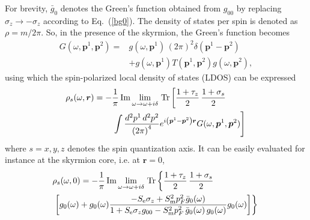 \documentclass[twocolumn,showpacs,floatfix,longbibliography]{revtex4-1}
\begin{document}
For brevity, $\bar g_{0}$ denotes the Green's function obtained from $g_{00}$ by replacing $\sigma_z \rightarrow - \sigma_z$ according to Eq.~(\ref{bg0}). The density of states per spin is denoted as $\rho = m/2\pi$. So, in the presence of the skyrmion, the Green's function becomes
\begin{align}
	G(\omega,\bm p^1,\bm p^2) =& g(\omega,\bm p^1)\,(2\pi)^2\delta(\bm p^1-\bm p^2) \nonumber \\ 
	          &  +g(\omega,\bm p^1) T(\bm p^1,\bm p^2) g(\omega,\bm p^2),
	\label{G}
\end{align}
using which the spin-polarized local density of states (LDOS) can be expressed
\begin{align}
	\rho_s(\omega,\bm r) = -&\frac{1}{\pi}\,{\rm Im}\lim_{\omega\rightarrow \omega+i\delta}{\rm\,Tr} \left[ \frac{1+\tau_z}{2}\,\frac{1+\sigma_s}{2} \right. \label{rhor} \\
	&\left.\int \frac{d^2p^1\,d^2p^2}{\left( 2\pi \right)^4} e^{i\left( \bm p^1-\bm p^2 \right)\bm r} G(\omega,\bm p^1,\bm p^2)\right]\, \nonumber 
\end{align}
where $s=x,y,z$ denotes the spin quantization axis. It can be easily evaluated for instance at the skyrmion core, i.e. at $\bm r=0$,
\begin{align}
	& \rho_s(\omega,0) = -\frac{1}{\pi}\,{\rm Im}\lim_{\omega\rightarrow \omega+i\delta}{\rm \,Tr} \left\{  \frac{1+\tau_z}{2}\,\frac{1+\sigma_s}{2}  \right. \label{spldos} \\
	&\left.\left[g_0(\omega)+g_0(\omega)  \frac{-S_{\rm e}\sigma_z+S^2_{\rm m}p_F^2\bar g_{0}(\omega)}{1+S_{\rm e}\sigma_zg_{00}-S^2_{\rm m}p_F^2\,\bar g_{0}(\omega)\, g_{0}(\omega)} g_0(\omega)  \right]\right\}\, \nonumber 
\end{align}

\end{document}
